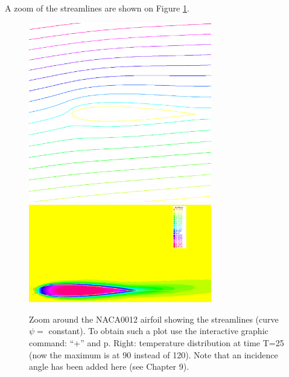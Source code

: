 \documentclass[a4paper,twoside,12pt]{book}
\begin{document}
A zoom of the streamlines are shown on Figure \ref{figpotential}.

\begin{figure}[htbp]
\begin{center}
\includegraphics[width=8cm]{potential}
\includegraphics[width=8cm]{potheat}

\caption{\label{figpotential} Zoom around the NACA0012 airfoil showing the streamlines (curve $\psi=$ constant).
To obtain such a plot use the interactive graphic command: ``+'' and p.
Right: temperature distribution at time T=25 (now the maximum is at 90 instead of 120).
Note that an incidence angle has been added here (see Chapter 9).}
\end{center}
\end{figure}
\end{document}
